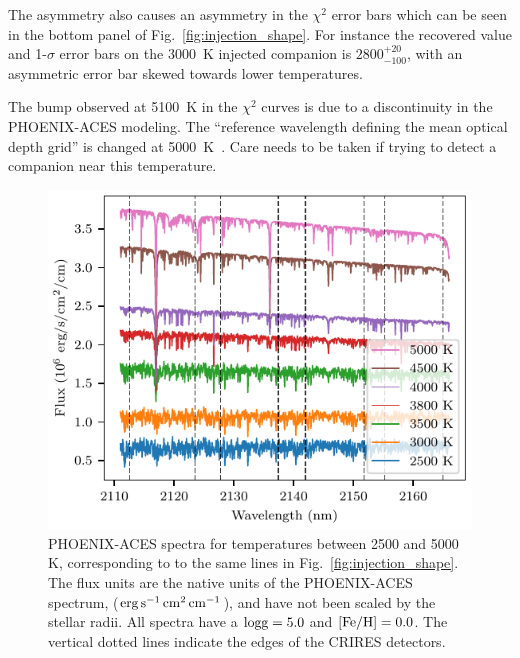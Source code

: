 \documentclass[fleqn,usenatbib]{mnras}
\begin{document}
The asymmetry also causes an asymmetry in the \(\chi^2\) error bars which can be seen in the bottom panel of Fig.~\ref{fig:injection_shape}. For instance the recovered value and 1-\(\sigma\) error bars on the 3000~K injected companion is \(2800 ^{+20}_{-100} \), with an asymmetric error bar skewed towards lower temperatures.

The bump observed at 5100~K in the \(\chi^2\) curves is due to a discontinuity in the PHOENIX-ACES modeling. The ``reference wavelength defining the mean optical depth grid'' is changed at 5000~K~\citep[][Sect. 2.3]{husser_new_2013}. Care needs to be taken if trying to detect a companion near this temperature.

\begin{figure}
    \centering
    \includegraphics[width=\hsize]{images/companion_spectra.pdf}
    \caption{PHOENIX-ACES spectra for temperatures between 2500 and 5000 K, corresponding to to the same lines in Fig.~\ref{fig:injection_shape}. The flux units are the native units of the PHOENIX-ACES spectrum, (\(\rm erg\,s^{-1}\,cm^{2}\,cm^{-1}\)), and have not been scaled by the stellar radii. All spectra have a \(\rm logg=5.0\) and \(\rm [Fe/H]=0.0\). The vertical dotted lines indicate the edges of the CRIRES detectors.}
    \label{fig:comp_spectra}
\end{figure}
\end{document}
